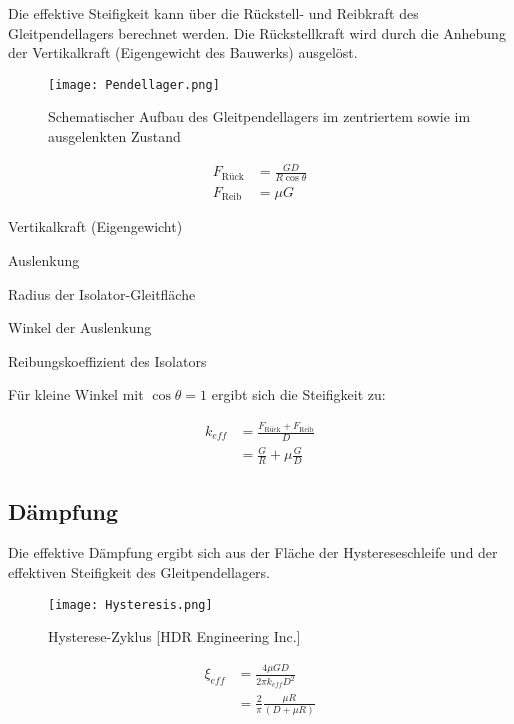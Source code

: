 Die effektive Steifigkeit kann über die Rückstell- und Reibkraft des Gleitpendellagers berechnet werden. Die Rückstellkraft wird durch die Anhebung der Vertikalkraft (Eigengewicht des Bauwerks) ausgelöst. \cite{Pocanschi}

\begin{figure}[H]
    \centering
    \texttt{[image: Pendellager.png]}
    \caption{Schematischer Aufbau des Gleitpendellagers im zentriertem sowie im ausgelenkten Zustand \cite{Romen}}
\end{figure}

\begin{align*}
F_{\text{Rück}} &= \frac{G D}{R \cos \theta}\\
F_{\text{Reib}} &= \mu G
\end{align*}

  Vertikalkraft (Eigengewicht)\par
{}  Auslenkung\par
{}  Radius der Isolator-Gleitfläche\par
\makebox[0.8cm]{$\theta$}  Winkel der Auslenkung\par
\makebox[0.8cm]{$\mu$}  Reibungskoeffizient des Isolators\par

Für kleine Winkel mit $\cos \theta = 1$ ergibt sich die Steifigkeit zu:

\begin{align*}
k_{eff} &= \frac{F_{\text{Rück}} + F_{\text{Reib}}}{D}\\
        &= \frac{G}{R} + \mu \frac{G}{D}
\end{align*}

\subsection{Dämpfung}
\label{sec:daempdung}

Die effektive Dämpfung ergibt sich aus der Fläche der Hystereseschleife und der effektiven Steifigkeit des Gleitpendellagers. \cite{Huber}\cite{Pocanschi}

\begin{figure}[h]
    \centering
    \texttt{[image: Hysteresis.png]}
    \caption{Hysterese-Zyklus [HDR Engineering Inc.]}
\end{figure}

\begin{align*}
\xi_{eff} &= \frac{4 \mu G D}{2 \pi k_{eff} D^2}\\
          &= \frac{2}{\pi} \frac{\mu R}{(D + \mu R)}
\end{align*}




